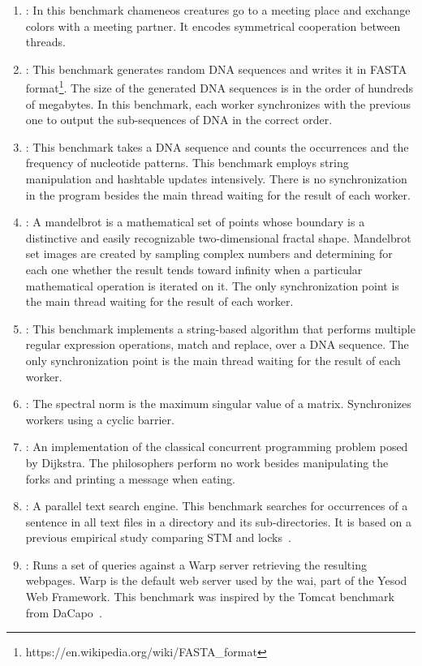 \begin{enumerate}
  \item \label{bench:chameneos}\chameneos: In this benchmark chameneos creatures go to a meeting place and exchange colors with a meeting partner. It encodes symmetrical cooperation between threads.

  \item \fasta:  This benchmark generates random DNA sequences and writes it in FASTA format\footnote{https://en.wikipedia.org/wiki/FASTA\_format}. The size of the generated DNA sequences is in the order of hundreds of megabytes. In this benchmark,  each worker synchronizes with the previous one to output the sub-sequences of DNA in the correct order.

  \item \knucleotide: This benchmark takes a DNA sequence and counts the occurrences and the frequency of nucleotide patterns. This benchmark employs string manipulation and hashtable updates intensively. There is no synchronization in the program besides the main thread waiting for the result of each worker.

  \item \mandelbrot: A mandelbrot is a mathematical set of points whose boundary is a distinctive and easily recognizable two-dimensional fractal shape. Mandelbrot set images are created by sampling complex numbers and determining for each one whether the result tends toward infinity when a particular mathematical operation is iterated on it. The only synchronization point is the main thread waiting for the result of each worker.

  \item \regex: This benchmark implements a string-based algorithm that performs multiple regular expression operations, match and replace, over a DNA sequence. The only synchronization point is the main thread waiting for the result of each worker.

  \item \label{bench:spectral}\spectral: The spectral norm is the maximum singular value of a matrix. Synchronizes workers using a cyclic barrier.

  \item \label{bench:dining}\dining: An implementation of the classical concurrent programming problem posed by Dijkstra. The philosophers perform no work besides manipulating the forks and printing a message when eating.

  \item \label{bench:tsearch}\tsearch: A parallel text search engine. This benchmark searches for occurrences of a sentence in all text files in a directory and its sub-directories. It is based on a previous empirical study comparing STM and locks~\citep{pankratius:2011}.

  \item \label{bench:warp}\warp: Runs a set of queries against a Warp server retrieving the resulting webpages. Warp is the default web server used by the \ac{wai}, part of the Yesod Web Framework. This benchmark was inspired by the Tomcat benchmark from DaCapo~\citep{blackburn:2006}.
\end{enumerate}

